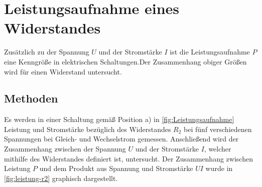 



\section{Leistungsaufnahme eines Widerstandes}

Zusätzlich zu der Spannung $U$ und der Stromstärke $I$ ist die Leistungsaufnahme $P$ eine Kenngröße in elektrischen Schaltungen.Der Zusammenhang obiger Größen wird für einen Widerstand untersucht.



\subsection{Methoden}
Es werden in einer Schaltung gemäß Position a) in \cref{fig:Leistungsaufnahme} Leistung und Stromstärke bezüglich des Widerstandes $R_2$ bei fünf verschiedenen Spannungen bei Gleich- und Wechselstrom gemessen.
Anschließend wird der Zusammenhang zwischen der Spannung $U$ und der Stromstärke $I$, welcher mithilfe des Widerstandes definiert ist, untersucht.
Der Zusammenhang zwischen Leistung $P$ und dem Produkt aus Spannung und Stromstärke $UI$ wurde in \cref{fig:leistung-r2} graphisch dargestellt.








































